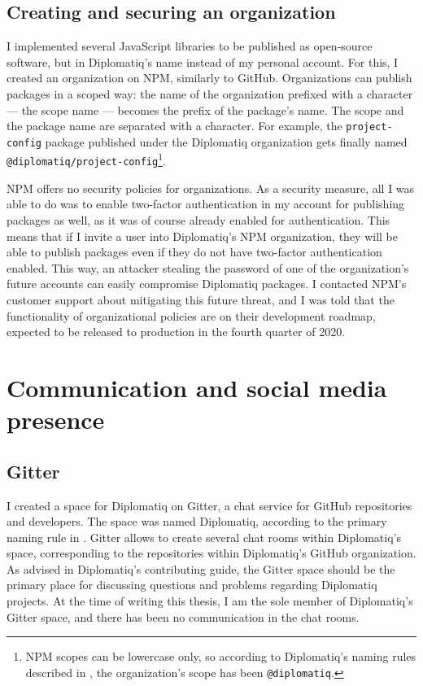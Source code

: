 \subsection{Creating and securing an organization}

I implemented several JavaScript libraries to be published as open-source software, but in Diplomatiq's name instead of my personal account. For this, I created an organization on NPM, similarly to GitHub. Organizations can publish packages in a scoped way: the name of the organization prefixed with a  character — the scope name — becomes the prefix of the package's name. The scope and the package name are separated with a \textquote{/} character. For example, the \lstinline{project-config} package published under the Diplomatiq organization gets finally named \lstinline{@diplomatiq/project-config}\footnote{NPM scopes can be lowercase only, so according to Diplomatiq's naming rules described in , the organization's scope has been \lstinline{@diplomatiq}.}.

NPM offers no security policies for organizations. As a security measure, all I was able to do was to enable two-factor authentication in my account for publishing packages as well, as it was of course already enabled for authentication. This means that if I invite a user into Diplomatiq's NPM organization, they will be able to publish packages even if they do not have two-factor authentication enabled. This way, an attacker stealing the password of one of the organization's future accounts can easily compromise Diplomatiq packages. I contacted NPM's customer support about mitigating this future threat, and I was told that the functionality of organizational policies are on their development roadmap, expected to be released to production in the fourth quarter of 2020.

\section{Communication and social media presence}

\subsection{Gitter}

I created a space for Diplomatiq on Gitter, a chat service for GitHub repositories and developers. The space was named Diplomatiq, according to the primary naming rule in . Gitter allows to create several chat rooms within Diplomatiq's space, corresponding to the repositories within Diplomatiq's GitHub organization. As advised in Diplomatiq's contributing guide, the Gitter space should be the primary place for discussing questions and problems regarding Diplomatiq projects. At the time of writing this thesis, I am the sole member of Diplomatiq's Gitter space, and there has been no communication in the chat rooms.

